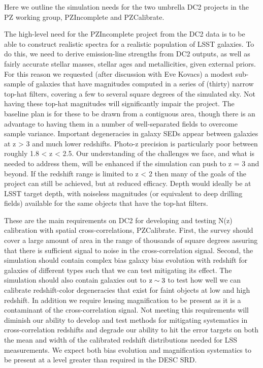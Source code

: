 \documentclass[preprint,times]{aastex61}
\begin{document}
Here we outline the simulation needs for the two umbrella DC2 projects in the PZ working group, PZIncomplete and PZCalibrate.

The high-level need for the PZIncomplete project from the DC2 data is to be able to construct realistic spectra for a realistic population of LSST galaxies. To do this, we need to derive emission-line strengths from DC2 outputs, as well as fairly accurate stellar masses, stellar ages and metallicities, given external priors. For this reason we requested (after discussion with Eve Kovacs) a modest sub-sample of galaxies that have magnitudes computed in a series of (thirty) narrow top-hat filters, covering a few to several square degrees of the simulated sky. Not having these top-hat magnitudes will significantly impair the project. The baseline plan is for these to be drawn from a contiguous area, though there is an advantage to having them in a number of well-separated fields to overcome sample variance. Important degeneracies in galaxy SEDs appear between galaxies at z > 3 and much lower redshifts. Photo-z precision is particularly poor between roughly 1.8 < z < 2.5. Our understanding of the challenges we face, and what is needed to address them, will be enhanced if the simulation can push to z = 3 and beyond. If the redshift range is limited to z < 2 then many of the goals of the project can still be achieved, but at reduced efficacy. Depth would ideally be at LSST target depth, with noiseless magnitudes (or equivalent to deep drilling fields) available for the same objects that have the top-hat filters.

These are the main requirements on DC2 for developing and testing N(z) calibration with spatial cross-correlations, PZCalibrate. First, the survey should cover a large amount of area in the range of thousands of square degrees assuring that there is sufficient signal to noise in the cross-correlation signal. Second, the simulation should contain complex bias galaxy bias evolution with redshift for galaxies of different types such that we can test mitigating its effect. The simulation should also contain galaxies out to $\rm{z} \sim 3$ to test how well we can calibrate redshift-color degeneracies that exist for faint objects at low and high redshift. In addition we require lensing magnification to be present as it is a contaminant of the cross-correlation signal. Not meeting this requirements will diminish our ability to develop and test methods for mitigating systematics in cross-correlation redshifts and degrade our ability to hit the error targets on both the mean and width of the calibrated redshift distributions needed for LSS measurements. We expect both bias evolution and magnification systematics to be present at a level greater than required in the DESC SRD.
\end{document}
